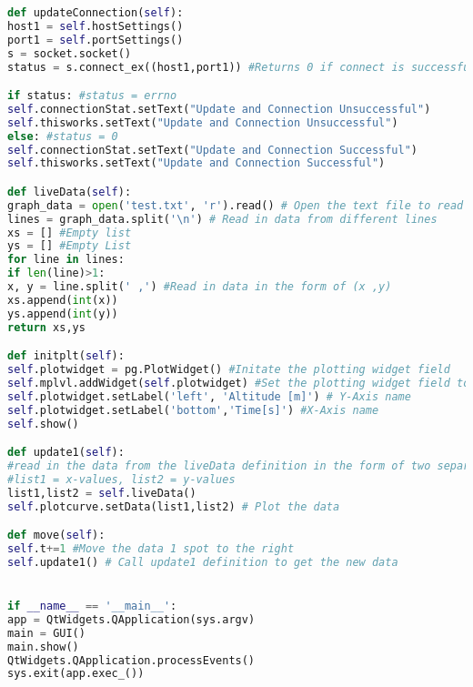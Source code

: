\begin{lstlisting}[language=Python,caption={GUI.py},label={lst:GUI.py}]
def updateConnection(self):
host1 = self.hostSettings()
port1 = self.portSettings()
s = socket.socket()
status = s.connect_ex((host1,port1)) #Returns 0 if connect is successful, returns errno if not

if status: #status = errno
self.connectionStat.setText("Update and Connection Unsuccessful")
self.thisworks.setText("Update and Connection Unsuccessful")
else: #status = 0
self.connectionStat.setText("Update and Connection Successful")
self.thisworks.setText("Update and Connection Successful")

def liveData(self):
graph_data = open('test.txt', 'r').read() # Open the text file to read in data
lines = graph_data.split('\n') # Read in data from different lines
xs = [] #Empty list
ys = [] #Empty List
for line in lines:
if len(line)>1:
x, y = line.split(' ,') #Read in data in the form of (x ,y)
xs.append(int(x))
ys.append(int(y))
return xs,ys

def initplt(self):
self.plotwidget = pg.PlotWidget() #Initate the plotting widget field
self.mplvl.addWidget(self.plotwidget) #Set the plotting widget field to populate the QVBoxLayout widget field
self.plotwidget.setLabel('left', 'Altitude [m]') # Y-Axis name
self.plotwidget.setLabel('bottom','Time[s]') #X-Axis name
self.show()

def update1(self):
#read in the data from the liveData definition in the form of two separate lists. 
#list1 = x-values, list2 = y-values
list1,list2 = self.liveData()
self.plotcurve.setData(list1,list2) # Plot the data

def move(self):
self.t+=1 #Move the data 1 spot to the right
self.update1() # Call update1 definition to get the new data


if __name__ == '__main__':
app = QtWidgets.QApplication(sys.argv)
main = GUI()
main.show()
QtWidgets.QApplication.processEvents()
sys.exit(app.exec_())
\end{lstlisting}

\newpage
